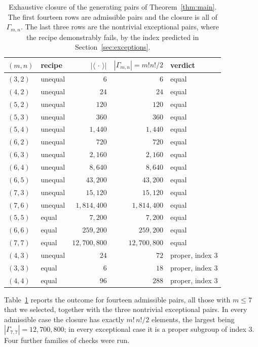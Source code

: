 \documentclass[11pt]{article}
\theoremstyle{plain}
\theoremstyle{definition}
\theoremstyle{remark}
\numberwithin{equation}{section}
\newcommand{\Gam}{\Gamma}
\begin{document}
\begin{table}[tb]
\centering
\small
\begin{tabular}{llrrl}
\toprule
$(m,n)$ & recipe & $|\langle\,\cdot\,\rangle|$ & $|\Gam_{m,n}| = m!n!/2$ & verdict\\
\midrule
$(3,2)$ & unequal & $6$ & $6$ & equal\\
$(4,2)$ & unequal & $24$ & $24$ & equal\\
$(5,2)$ & unequal & $120$ & $120$ & equal\\
$(5,3)$ & unequal & $360$ & $360$ & equal\\
$(5,4)$ & unequal & $1{,}440$ & $1{,}440$ & equal\\
$(6,2)$ & unequal & $720$ & $720$ & equal\\
$(6,3)$ & unequal & $2{,}160$ & $2{,}160$ & equal\\
$(6,4)$ & unequal & $8{,}640$ & $8{,}640$ & equal\\
$(6,5)$ & unequal & $43{,}200$ & $43{,}200$ & equal\\
$(7,3)$ & unequal & $15{,}120$ & $15{,}120$ & equal\\
$(7,6)$ & unequal & $1{,}814{,}400$ & $1{,}814{,}400$ & equal\\
$(5,5)$ & equal & $7{,}200$ & $7{,}200$ & equal\\
$(6,6)$ & equal & $259{,}200$ & $259{,}200$ & equal\\
$(7,7)$ & equal & $12{,}700{,}800$ & $12{,}700{,}800$ & equal\\
\midrule
$(4,3)$ & unequal & $24$ & $72$ & proper, index $3$\\
$(3,3)$ & equal & $6$ & $18$ & proper, index $3$\\
$(4,4)$ & equal & $96$ & $288$ & proper, index $3$\\
\bottomrule
\end{tabular}
\caption{Exhaustive closure of the generating pairs of Theorem~\ref{thm:main}. The first
fourteen rows are admissible pairs and the closure is all of $\Gam_{m,n}$. The last three rows
are the nontrivial exceptional pairs, where the recipe demonstrably fails, by the index
predicted in Section~\ref{sec:exceptions}.}
\label{tab:closure}
\end{table}

Table~\ref{tab:closure} reports the outcome for fourteen admissible pairs, all those with
$m \le 7$ that we selected, together with the three nontrivial exceptional pairs. In every
admissible case the closure has exactly $m!\,n!/2$ elements, the largest being
$|\Gam_{7,7}| = 12{,}700{,}800$; in every exceptional case it is a proper subgroup of index $3$.
Four further families of checks were run.
\end{document}

